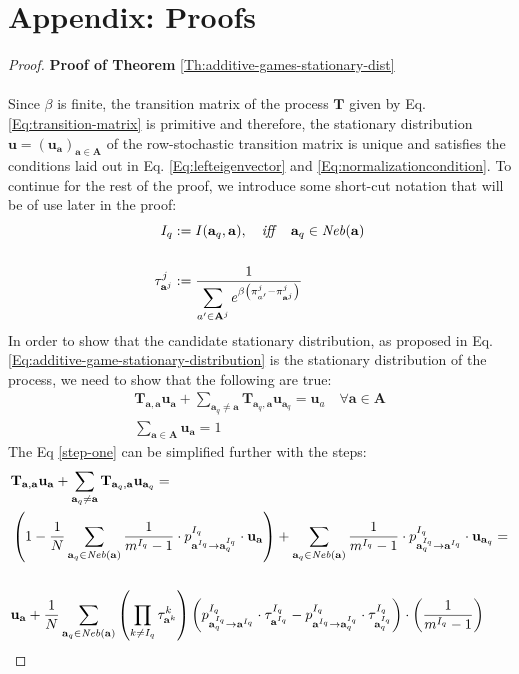\documentclass[11pt]{article}
\theoremstyle{plainCl1}
\theoremstyle{plainCl2}
\newcommand{\A}{\mathbf{A}}
\newcommand{\abf}{\mathbf{a}}
\newcommand{\T}{\mathbf{T}}
\newcommand{\ubf}{\mathbf{u}}
\begin{document}
\section*{Appendix: Proofs}
\label{Section:Appendix}
\begin{proof}
\textbf{Proof of Theorem} \ref{Th:additive-games-stationary-dist} \\ \\ 
Since $\beta$ is finite, the transition matrix of the process $\T$ given by Eq. \ref{Eq:transition-matrix} is primitive and therefore, the stationary distribution $\ubf = (\ubf_\abf)_{\abf \in \A}$ of the row-stochastic transition matrix is unique and satisfies the conditions laid out in Eq. \ref{Eq:lefteigenvector} and \ref{Eq:normalizationcondition}. To continue for the rest of the proof, we introduce some short-cut notation that will be of use later in the proof:\\
\begin{align}
I_{q} &:= I(\abf_q,\abf), \quad \mathit{iff} \quad \abf_q \in \mathit{Neb}(\abf) \\ \notag \\ 
\label{Eq:shortcut-tau}
\tau^j_{\abf^j} &:= \frac{1}{\displaystyle \sum_{a' \in \A^j} e^{\beta \left( \pi^j_{a'} -  \pi^j_{\abf^j} \right) }} 
\end{align}
\noindent In order to show that the candidate stationary distribution, as proposed in Eq. \ref{Eq:additive-game-stationary-distribution} is the stationary distribution of the process, we need to show that the following are true:
\begin{eqnarray}
\label{step-one}
\T_{\abf,\abf} \ubf_\abf  + \sum_{\abf_q \neq \abf} \T_{\abf_q, \abf} \ubf_{\abf_q}= \ubf_a \quad \forall \abf \in \A \\ 
\label{step-two}
\sum_{\abf \in \A} \ubf_\abf  = 1
\end{eqnarray}
The Eq \ref{step-one} can be simplified further with the steps: 
\begin{align}
&\T_{\abf,\abf} \ubf_\abf  + \sum_{\abf_q \neq \abf} \T_{\abf_q, \abf} \ubf_{\abf_q}= \\
& \left( 1 - \frac{1}{N} \sum_{\abf_q \in \mathit{Neb}(\abf)} \frac{1}{m^{I_q}-1} \cdot p^{I_q}_{\abf^{I_q} \to \abf^{I_q}_q} \cdot \ubf_{\abf} \right) + \sum_{\abf_q \in \mathit{Neb}(\abf)}  \frac{1}{m^{I_q}-1} \cdot p^{I_q}_{\abf^{I_q}_q \to \abf^{I_q}} \cdot \ubf_{\abf_q} = \\ \notag \\
\label{eq:important-step}
& \ubf_\abf +  \frac{1}{N} \sum_{\abf_q \in \mathit{Neb}(\abf)} \left( \prod_{k \neq I_q} \tau^k_{\abf^k} \right) \left( p^{I_q}_{\abf^{I_q}_q \to \abf^{I_q}} \cdot \tau^{I_q}_{\abf^{I_q}} -  p^{I_q}_{\abf^{I_q} \to \abf^{I_q}_q} \cdot \tau^{I_q}_{\abf^{I_q}_q} \right) \cdot \left(  \frac{1}{m^{I_q}-1} \right)

\end{align}
\end{proof}
\end{document}
